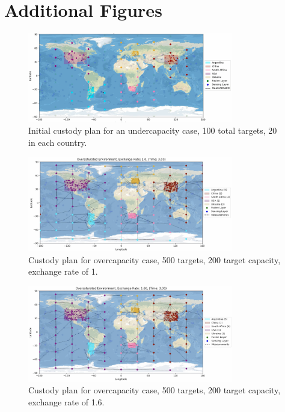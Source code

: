 \section{Additional Figures}

\begin{figure}[t]
    \centering
    \includegraphics[width=0.8\textwidth]{figs/nominal_custody.png}
    \caption{Initial custody plan for an undercapacity case, 100 total targets, 20 in each country.}
    \label{fig:initial_custody_nominal}
\end{figure}


\begin{figure}[t]
    \centering
    \includegraphics[width=0.8\textwidth]{figs/exchange_rate_1.png}
    \caption{Custody plan for overcapacity case, 500 targets, 200 target capacity, exchange rate of 1.}
    \label{fig:exchange_rate_1}
\end{figure}

\begin{figure}[t]
    \centering
    \includegraphics[width=0.8\textwidth]{figs/exchange_rate_1.6.png}
    \caption{Custody plan for overcapacity case, 500 targets, 200 target capacity, exchange rate of 1.6.}
    \label{fig:exchange_rate_1.6}
\end{figure}